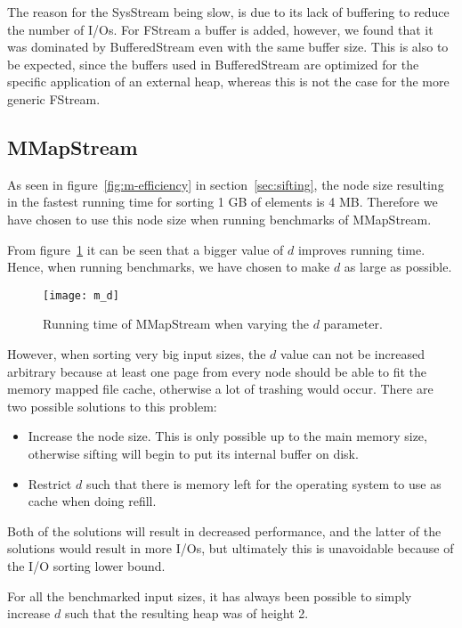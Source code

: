 The reason for the SysStream being slow, is due to its lack of buffering to reduce the number of I/Os. For FStream a buffer is added, however, we found that it was dominated by BufferedStream even with the same buffer size. This is also to be expected, since the buffers used in BufferedStream are optimized for the specific application of an external heap, whereas this is not the case for the more generic FStream.

\subsection{MMapStream}
As seen in figure~\ref{fig:m-efficiency} in section~\ref{sec:sifting}, the node size resulting in the fastest running time for sorting 1 GB of elements is 4 MB. Therefore we have chosen to use this node size when running benchmarks of MMapStream.

From figure~\ref{fig:m:vary-d} it can be seen that a bigger value of $d$ improves running time. Hence, when running benchmarks, we have chosen to make $d$ as large as possible. 

\begin{figure}[h!]
  \centering
  \texttt{[image: m\_d]}
  \caption{Running time of MMapStream when varying the $d$ parameter.}
  \label{fig:m:vary-d}
\end{figure}

However, when sorting very big input sizes, the $d$ value can not be increased arbitrary because at least one page from every node should be able to fit the memory mapped file cache, otherwise a lot of trashing would occur. There are two possible solutions to this problem:
\begin{itemize}
\item Increase the node size. This is only possible up to the main memory size, otherwise sifting will begin to put its internal buffer on disk.
\item Restrict $d$ such that there is memory left for the operating system to use as cache when doing refill.
\end{itemize}
Both of the solutions will result in decreased performance, and the latter of the solutions would result in more I/Os, but ultimately this is unavoidable because of the I/O sorting lower bound.

For all the benchmarked input sizes, it has always been possible to simply increase $d$ such that the resulting heap was of height 2.

